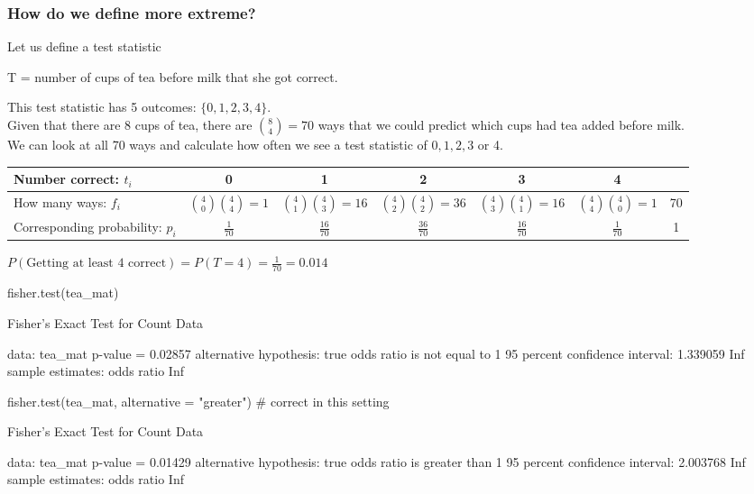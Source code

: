 \documentclass[a4paper]{article}
\begin{document}
\subsubsection{How do we define more extreme?}
Let us define a test statistic
\begin{center}
	T = number of cups of tea before milk that she got correct.
\end{center}
This test statistic has 5 outcomes: \( \{0,1,2,3,4\} \).\\
Given that there are 8 cups of tea, there are \( \binom{8}{4} = 70 \) ways that we could predict which cups had tea added before milk.\\
We can look at all 70 ways and calculate how often we see a test statistic of \( 0,1,2,3 \) or 4.
\begin{table}[H]
	\begin{tabular}{@{}l|ccccc|c@{}}
	Number correct: \( t_i \)            & 0 								  & 1                                   & 2                                  & 3 & 4 &  \\ \midrule
	How many ways:  \( f_i \)            & \( \binom{4}{0}\binom{4}{4} = 1 \) & \( \binom{4}{1}\binom{4}{3} = 16 \) & \( \binom{4}{2}\binom{4}{2} =36 \) & \( \binom{4}{3}\binom{4}{1} = 16 \) &  \( \binom{4}{4}\binom{4}{0} = 1 \) & 70 \\
	Corresponding probability: \( p_i \) & \( \frac{1}{70} \)                 & \( \frac{16}{70} \)                 & \( \frac{36}{70} \)                & \(\frac{16}{70} \) & \( \frac{1}{70} \) & 1 \\ \bottomrule
	\end{tabular}
\end{table}
\( P(\text{Getting at least 4 correct}) = P(T = 4) = \frac{1}{70} = 0.014 \) 
\begin{Schunk}
\begin{Sinput}
fisher.test(tea_mat)
\end{Sinput}
\begin{Soutput}

	Fisher's Exact Test for Count Data

data:  tea_mat
p-value = 0.02857
alternative hypothesis: true odds ratio is not equal to 1
95 percent confidence interval:
 1.339059      Inf
sample estimates:
odds ratio 
       Inf 
\end{Soutput}
\begin{Sinput}
fisher.test(tea_mat, alternative = "greater") # correct in this setting
\end{Sinput}
\begin{Soutput}

	Fisher's Exact Test for Count Data

data:  tea_mat
p-value = 0.01429
alternative hypothesis: true odds ratio is greater than 1
95 percent confidence interval:
 2.003768      Inf
sample estimates:
odds ratio 
       Inf 
\end{Soutput}
\end{Schunk}
\end{document}
